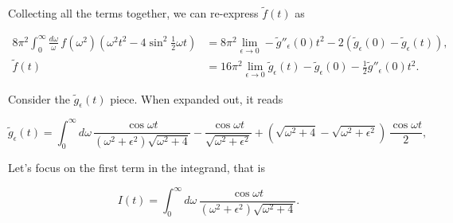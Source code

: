 \documentclass{article}
\numberwithin{equation}{section} %
\begin{document}
\noindent Collecting all the terms together, we can re-express $\tilde{f}(t)$ as 

\begin{equation}
\begin{split}
8\pi^2\int^\infty_0 \frac{d\omega}{\omega}\, f(\omega^2)(\omega^2 t^2 - 4 \sin^2 \frac{1}{2}\omega t) &= 8\pi^2 \lim_{\epsilon\rightarrow 0} - \tilde{g}''_\epsilon(0)t^2 - 2(\tilde{g}_\epsilon(0)-\tilde{g}_\epsilon(t)),\\
\tilde{f}(t)&= 16\pi^2 \lim_{\epsilon\rightarrow 0}\tilde{g}_\epsilon(t) - \tilde{g}_\epsilon(0) - \frac{1}{2} \tilde{g}''_\epsilon(0)t^2.
\end{split}
\label{ftilde}
\end{equation}

Consider the $\tilde{g}_\epsilon(t)$ piece. When expanded out, it reads


\begin{equation}
\tilde{g}_\epsilon(t) = \int^\infty_0 d\omega\, \frac{\cos\omega t}{(\omega^2+\epsilon^2)\sqrt{\omega^2+4}} - \frac{\cos \omega t}{\sqrt{\omega^2+\epsilon^2}} + (\sqrt{\omega^2+4} - \sqrt{\omega^2+\epsilon^2}) \, \frac{\cos \omega t}{2},
\label{g_epsilon}
\end{equation}

Let's focus on the first term in the integrand, that is

\begin{equation}
I(t) = \int^\infty_0 d\omega\, \frac{\cos \omega t}{(\omega^2+\epsilon^2)\sqrt{\omega^2+4}}.
\end{equation}
\end{document}
